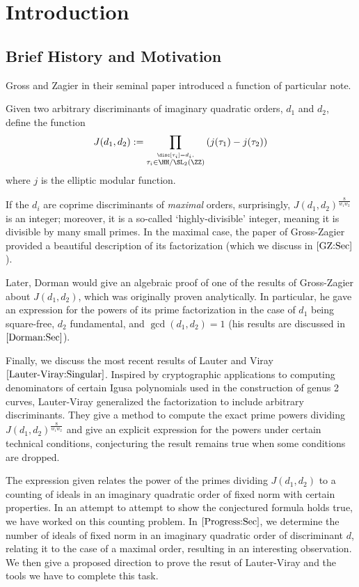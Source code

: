 \documentclass[11pt, proquest]{uwthesis}
\begin{document}
\tableofcontents
\textpages

\chapter{Introduction}


\section{Brief History and Motivation}
Gross and Zagier in their seminal paper \cite[Def~1.2]{Gross-Zagier:Singular} introduced a function of particular note.
\begin{definition}\label{J:Def}
  Given two arbitrary discriminants of imaginary quadratic orders, $d_1$ and $d_2$, define the function
  $$J(d_1,d_2) := \prod_{\stackrel{\disc[\tau_i] = d_i,}{\tau_i\in\HH/\SL_2(\ZZ)}} \left( j(\tau_1) - j(\tau_2)\right)$$
  where $j$ is the elliptic modular function.
\end{definition}

If the $d_i$ are coprime discriminants of {\it maximal} orders, surprisingly, $J(d_1,d_2)^{\frac{8}{w_1w_2}}$ is an integer; moreover, it is a so-called `highly-divisible' integer, meaning it is divisible by many small primes.
In the maximal case, the paper of Gross-Zagier provided a beautiful description of its factorization (which we discuss in \textsection$\ref{GZ:Sec}$).

Later, Dorman \cite{Dorman:elliptic_modular} would give an algebraic proof of one of the results of Gross-Zagier about $J(d_1,d_2)$, which was originally proven analytically.
In particular, he gave an expression for the powers of its prime factorization in the case of $d_1$ being square-free, $d_2$ fundamental, and $\gcd(d_1,d_2) = 1$ (his results are discussed in \textsection$\ref{Dorman:Sec}$).

Finally, we discuss the most recent results of Lauter and Viray $\cite{Lauter-Viray:Singular}$.
Inspired by cryptographic applications to computing denominators of certain Igusa polynomials \cite{Lauter-Viray:Igusa} used in the construction of genus 2 curves, Lauter-Viray generalized the factorization to include arbitrary discriminants.
They give a method to compute the exact prime powers dividing $J(d_1,d_2)^{\frac{8}{w_1w_2}}$ and give an explicit expression for the powers under certain technical conditions, conjecturing the result remains true when some conditions are dropped.

The expression given relates the power of the primes dividing $J(d_1,d_2)$ to a counting of ideals in an imaginary quadratic order of fixed norm with certain properties.
In an attempt to attempt to show the conjectured formula holds true, we have worked on this counting problem.
In \textsection$\ref{Progress:Sec}$, we determine the number of ideals of fixed norm in an imaginary quadratic order of discriminant $d$, relating it to the case of a maximal order, resulting in an interesting observation.
We then give a proposed direction to prove the resut of Lauter-Viray and the tools we have to complete this task.
\end{document}
